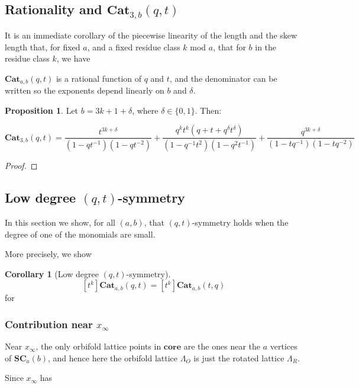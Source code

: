 \documentclass{amsart}[12pt]
\theoremstyle{definition}
\newtheorem{corollary}[dummy]{Corollary}
\newtheorem{proposition}[dummy]{Proposition}
\newcommand{\core}{\mathbf{core}}
\newcommand{\SC}{\mathbf{SC}}
\newcommand{\Cat}{\mathbf{Cat}}
\begin{document}
\subsection{Rationality and $\Cat_{3,b}(q,t)$}

It is an immediate corollary of the piecewise linearity of the length and the skew length that, for fixed $a$, and a fixed residue class $k$ mod $a$, that for $b$ in the residue class $k$, we have

$\Cat_{a,b}(q,t)$ is a rational function of $q$ and $t$, and the denominator can be written so the exponents depend linearly on $b$ and $\delta$.

 



\begin{proposition}
Let $b=3k+1+\delta$, where $\delta\in\{0,1\}$.  Then:

$$\Cat_{3,b}(q,t)=\frac{t^{3k+\delta}}{(1-qt^{-1})(1-qt^{-2})}+\frac{q^kt^k(q+t+q^\delta t^\delta)}{(1-q^{-1}t^2)(1-q^2t^{-1})}+\frac{q^{3k+\delta}}{(1-tq^{-1})(1-tq^{-2})}$$

\end{proposition}

\begin{proof}

\end{proof}


\subsection{Low degree \texorpdfstring{$(q,t)$}{(q,t)}-symmetry}
In this section we show, for all $(a,b)$, that $(q,t)$-symmetry holds when the degree of one of the monomials are small.  


More precisely, we show
\begin{corollary}[Low degree $(q,t)$-symmetry]
$$[t^k]\Cat_{a,b}(q,t)=[t^k]\Cat_{a,b}(t,q)$$
for 

\end{corollary}


\subsubsection{Contribution near $x_\infty$}
Near $x_\infty$, the only orbifold lattice points in $\core$ are the ones near the $a$ vertices of $\SC_a(b)$, and hence here the orbifold lattice $\Lambda_O$ is just the rotated lattice $\Lambda_R$.  

Since $x_\infty$ has 
\end{document}
